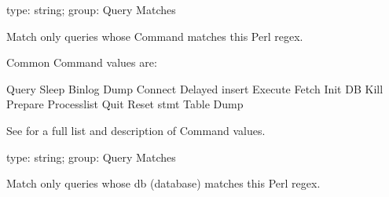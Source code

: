 \documentclass[letterpaper,10pt,english]{sphinxmanual}
\begin{document}

\begin{fulllineitems}
\label{\detokenize{mariadb-kill:cmdoption-mariadb-kill-match-command}}
\sphinxAtStartPar
type: string; group: Query Matches

\sphinxAtStartPar
Match only queries whose Command matches this Perl regex.

\sphinxAtStartPar
Common Command values are:

\begin{sphinxVerbatim}[commandchars=\\\{\}]
Query
Sleep
Binlog Dump
Connect
Delayed insert
Execute
Fetch
Init DB
Kill
Prepare
Processlist
Quit
Reset stmt
Table Dump
\end{sphinxVerbatim}

\sphinxAtStartPar
See  for a full
list and description of Command values.

\end{fulllineitems}


\begin{fulllineitems}
\label{\detokenize{mariadb-kill:cmdoption-mariadb-kill-match-db}}
\sphinxAtStartPar
type: string; group: Query Matches

\sphinxAtStartPar
Match only queries whose db (database) matches this Perl regex.

\end{fulllineitems}
\end{document}
